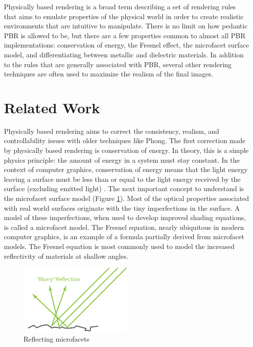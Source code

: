 \documentclass[12pt, letterpaper, twocolumn]{article}
\begin{document}
Physically based rendering is a broad term describing a set of rendering rules
that aims to emulate properties of the physical world in order to create
realistic environments that are intuitive to manipulate. There is no limit on
how pedantic PBR is allowed to be, but there are a few properties common to
almost all PBR implementations:  conservation of energy, the Fresnel effect,
the microfacet surface model, and differentiating between metallic and
dielectric materials\cite{PBEc}. In addition to the rules that are generally
associated with PBR, several other rendering techniques are often used to
maximize the realism of the final images.

\section{Related Work}

Physically based rendering aims to correct the consistency, realism, and
controllability issues with older techniques like Phong. The first correction
made by physically based rendering is conservation of energy. In theory, this
is a simple physics principle: the amount of energy in a system must stay
constant\cite{NERSA}. In the context of computer graphics, conservation of
energy means that the light energy leaving a surface must be less than or
equal to the light energy received by the surface (excluding emitted light)
\cite{lerpGL}. The next important concept to understand is the microfacet
surface model (Figure \ref{microfat}). Most of the optical properties
associated with real world surfaces originate with the tiny imperfections in
the surface. A model of these imperfections, when used to develop improved
shading equations, is called a microfacet model\cite{CoTor}. The Fresnel
equation, nearly ubiquitous in modern computer graphics, is an example of a
formula partially derived from microfacet models. The Fresnel equation is most
commonly used to model the increased reflectivity of materials at shallow
angles\cite{lerpGL}.

\begin{figure}
\centering \includegraphics[width=0.5\textwidth]{pbr_theory_microsurf.png}
\caption{Reflecting microfacets}
\label{microfat}
\end{figure}
\end{document}
